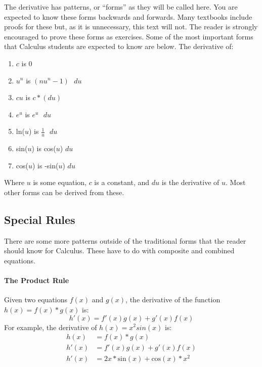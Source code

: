 \documentclass[../revisedmain.tex]{subfiles}
\begin{document}
\par The derivative has patterns, or ``forms'' as they will be called here. You are expected to know these forms backwards and forwards. Many textbooks include proofs for these but, as it is unnecessary, this text will not. The reader is strongly encouraged to prove these forms as exercises. Some of the most important forms that Calculus students are expected to know are below. The derivative of:
\begin{enumerate}
	\item $c$ is 0
	\item $u^n$ is $(nu^n-1)\text{ } du$
	\item $cu$ is $c*(du)$
	\item $e^u$ is $e^u\text{ } du$
	\item ln($u$) is $\frac{1}{u}\text{ }du$
	\item sin($u$) is cos($u$) $du$
	\item cos($u$) is -sin($u$) $du$
\end{enumerate}
Where $u$ is some equation, $c$ is a constant, and $du$ is the derivative of $u$. Most other forms can be derived from these.
\subsection{Special Rules}
\par There are some more patterns outside of the traditional forms that the reader should know for Calculus. These have to do with composite and combined equations.
\paragraph{The Product Rule} Given two equations $f(x)$ and $g(x)$, the derivative of the function $h(x)=f(x)*g(x)$ is: $$h'(x)=f'(x)g(x)+g'(x)f(x)$$ For example, the derivative of $h(x)=x^2sin(x)$ is: 
\begin{equation}
\begin{split}
h(x)&=f(x)*g(x) \\
h'(x)&=f'(x)g(x)+g'(x)f(x) \\
h'(x) &= 2x*\text{sin}(x)+\text{cos}(x)*x^2
\end{split}
\end{equation}
\end{document}
